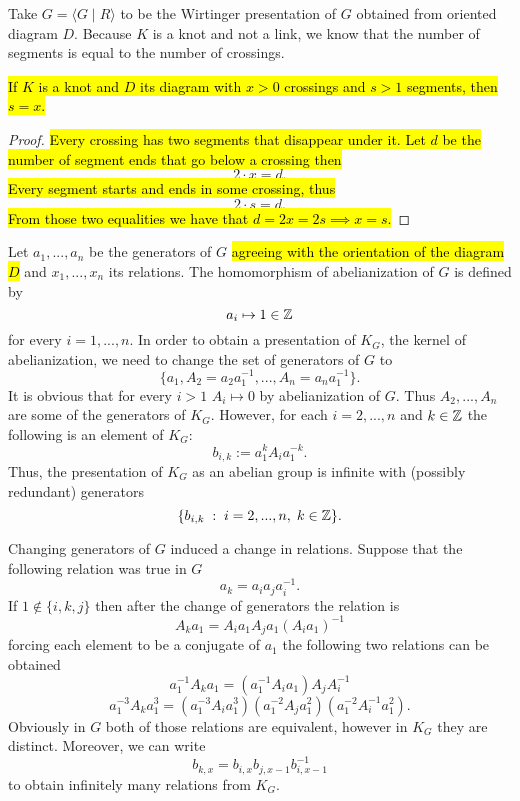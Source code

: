 Take $G=\langle G\;|\;R\rangle$ to be the Wirtinger presentation of $G$ obtained from oriented diagram $D$. Because $K$ is a knot and not a link, we know that the number of segments is equal to the number of crossings.

\begin{lemma}\hl{
  If $K$ is a knot and $D$ its diagram with $x>0$ crossings and $s>1$ segments, then $s=x$.}
\end{lemma}

\begin{proof}\hl{
  Every crossing has two segments that disappear under it. Let $d$ be the number of segment ends that go below a crossing then}
  $$2\cdot x=d.$$ \hl{
  Every segment starts and ends in some crossing, thus}
  $$2\cdot s=d.$$\hl{
  From those two equalities we have that $d=2x=2s\implies x=s$.}
\end{proof}

Let $a_1,...,a_n$ be the generators of $G$ \hl{agreeing with the orientation of the diagram $D$} and $x_1,...,x_n$ its relations. The homomorphism of abelianization of $G$ is defined by 
$$a_i\mapsto 1\in\operatorname{\mathbb{Z}}$$ 
for every $i=1,...,n$. In order to obtain a presentation of $K_G$, the kernel of abelianization, we need to change the set of generators of $G$ to 
$$\{a_1, A_2=a_2a_1^{-1},..., A_n=a_na_1^{-1}\}.$$
It is obvious that for every $i>1$ $A_i\mapsto0$ by abelianization of $G$. Thus $A_2,...,A_n$ are some of the generators of $K_G$. However, for each $i=2,...,n$ and $k\in\operatorname{\mathbb{Z}}$ the following is an element of $K_G$:
$$b_{i, k}:=a_1^k A_i a_1^{-k}.$$
Thus, the presentation of $K_G$ as an abelian group is infinite with (possibly redundant) generators 
$$\{b_{i,k}\;:\;i=2,...,n,\;k\in\operatorname{\mathbb{Z}}\}.$$

Changing generators of $G$ induced a change in relations. Suppose that the following relation was true in $G$
$$a_k=a_ia_ja_i^{-1}.$$
If $1\notin\{i,k,j\}$ then after the change of generators the relation is
$$ A_ka_1 = A_ia_1 A_ja_1 (A_ia_1)^{-1}
$$
forcing each element to be a conjugate of $a_1$ the following two relations can be obtained
$$ a_1^{-1}A_ka_1=(a_1^{-1} A_i a_1)A_jA_i^{-1}
$$
$$
a_1^{-3} A_k a_1^3 = (a_1^{-3} A_i a_1^3) (a_1^{-2} A_j a_1^2) (a_1^{-2} A_i^{-1} a_1^2).
$$
Obviously in $G$ both of those relations are equivalent, however in $K_G$ they are distinct. Moreover, we can write 
$$
b_{k, x}=b_{i, x}b_{j, x-1}b_{i, x-1}^{-1}
$$
to obtain infinitely many relations from $K_G$.

